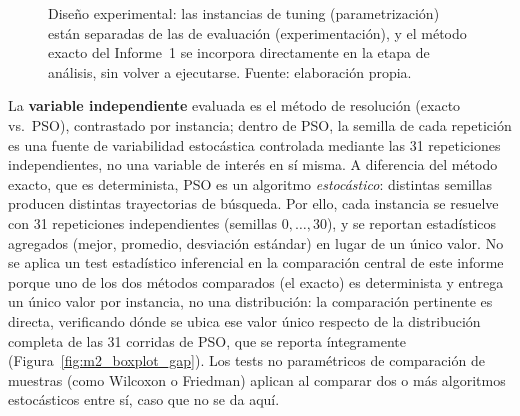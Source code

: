 \begin{figure}[H]
    \centering
    \caption{Diseño experimental: las instancias de tuning (parametrización) están
    separadas de las de evaluación (experimentación), y el método exacto del Informe~1
    se incorpora directamente en la etapa de análisis, sin volver a ejecutarse.
    Fuente: elaboración propia.}
    \label{fig:m2_diseno_experimental}
\end{figure}

La \textbf{variable independiente} evaluada es el método de resolución (exacto vs.\ PSO),
contrastado por instancia; dentro de PSO, la semilla de cada repetición es una fuente de
variabilidad estocástica controlada mediante las 31 repeticiones independientes, no una
variable de interés en sí misma. A diferencia del método exacto, que es determinista,
PSO es un algoritmo \textit{estocástico}: distintas semillas producen distintas
trayectorias de búsqueda. Por ello, cada instancia se resuelve con 31 repeticiones
independientes (semillas $0,\ldots,30$), y se reportan estadísticos agregados (mejor,
promedio, desviación estándar) en lugar de un único valor. No se aplica un test
estadístico inferencial en la comparación central de este informe porque uno de los dos
métodos comparados (el exacto) es determinista y entrega un único valor por instancia,
no una distribución: la comparación pertinente es directa, verificando dónde se ubica
ese valor único respecto de la distribución completa de las 31 corridas de PSO, que se
reporta íntegramente (Figura~\ref{fig:m2_boxplot_gap}). Los tests no paramétricos de
comparación de muestras (como Wilcoxon o Friedman) aplican al comparar dos o más
algoritmos estocásticos entre sí, caso que no se da aquí.

